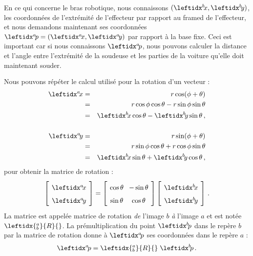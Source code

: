 En ce qui concerne le bras robotique, nous connaissons $(\bx,\by)$, les coordonnées de l'extrémité de l'effecteur par rapport au framed de l'effecteur, et nous demandons maintenant ses coordonnées $\ap=(\ax,\ay)$ par rapport à la base fixe. Ceci est important car si nous connaissons $\ap$, nous pouvons calculer la distance et l'angle entre l'extrémité de la soudeuse et les parties de la voiture qu'elle doit maintenant souder.

Nous pouvons répéter le calcul utilisé pour la rotation d'un vecteur :
\begin{eqnarray*}
\ax &=& r\cos(\phi+\theta)\\
&=&r\cos\phi\cos\theta - r\sin\phi\sin\theta\\
&=&\bx\cos\theta - \by\sin\theta\,,\\
\\
\ay &=& r\sin(\phi+\theta)\\
&=&r\sin\phi\cos\theta + r\cos\phi\sin\theta\\
&=&\bx\sin\theta + \by\cos\theta\,,\\
\end{eqnarray*}
pour obtenir la matrice de rotation :
\begin{equation}
\spacearray
\left[\begin{array}{c}\ax\\\ay\end{array}\right]=
\left[\begin{array}{cc}\cos\theta&-\sin\theta\\\sin\theta&\cos\theta\end{array}\right]
\left[\begin{array}{c}\bx\\\by\end{array}\right]\,.\label{eq.frame-to-frame}
\end{equation}
La matrice est appelée matrice de rotation \emph{de} l'image $b$ \emph{à} l'image $a$ et est notée $\leftidx{^a_b}{R}{}$. La prémultiplication du point $\bp$ dans le repère $b$ par la matrice de rotation donne à $\ap$ ses coordonnées dans le repère $a$ :
\[
\ap = \leftidx{^a_b}{R}{} \; \bp\,.
\]

\medskip


